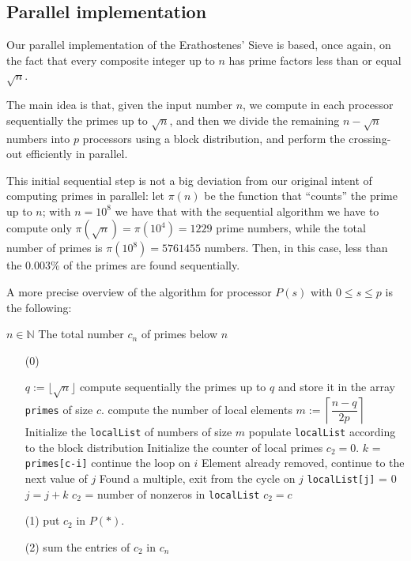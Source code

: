 \documentclass[a4paper,11pt]{article}
\newcommand{\N}{\mathbb{N}}
\begin{document}
\subsection{Parallel implementation}

Our parallel implementation of the Erathostenes' Sieve is based, once again, on the fact that every composite integer up to $n$ has prime factors less than or equal $\sqrt{n}$.

The main idea is that, given the input number $n$, we compute in each processor sequentially the primes up to $\sqrt{n}$, and then we divide the remaining $n-\sqrt{n}$ numbers into $p$ processors using a block distribution, and perform the crossing-out efficiently in parallel.

This initial sequential step is not a big deviation from our original intent of computing primes in parallel: let $\pi(n)$ be the function that ``counts'' the prime up to $n$; with $n=10^8$ we have that with the sequential algorithm we have to compute only $\pi(\sqrt{n}) = \pi(10^4) = 1229$ prime numbers, while the total number of primes is $\pi(10^8) = 5761455$ numbers. Then, in this case, less than the $0.003\%$ of the primes are found sequentially.

A more precise overview of the algorithm for processor $P(s)$ with $0 \leq s \leq p$ is the following:

\begin{algorithm}[H]
\begin{algorithmic}
\REQUIRE $n \in \N$
\ENSURE The total number $c_n$ of primes below $n$
\end{algorithmic}

\begin{enumerate}
\item[(0)] \begin{algorithmic}[1]
\STATE $q:= \lfloor \sqrt{n} \rfloor$
\STATE compute sequentially the primes up to $q$ and store it in the array \verb|primes| of size $c$.
\STATE compute the number of local elements $m:= \left\lceil \dfrac{n-q}{2p} \right\rceil$
\STATE Initialize the \verb|localList| of numbers of size $m$
\STATE populate \verb|localList| according to the block distribution
\STATE Initialize the counter of local primes $c_2 = 0$.
\STATE $k$ = \verb|primes[c-i]|
\STATE continue the loop on $i$
\ENDIF
{}
\STATE Element already removed, continue to the next value of $j$
\ENDIF
{}
\STATE Found a multiple, exit from the cycle on $j$
\ENDIF
\ENDFOR
{}
\STATE \verb|localList[j]| = 0
\STATE $j = j+k$
\ENDWHILE
\ENDFOR
\STATE $c_2$ = number of nonzeros in \verb|localList|
\STATE $c_2 = c$
\ENDIF
\end{algorithmic}
\item[(1)] put $c_2$ in $P(*)$.
\item[(2)] sum the entries of $c_2$ in $c_n$

\end{enumerate}
\end{algorithm}
\end{document}
